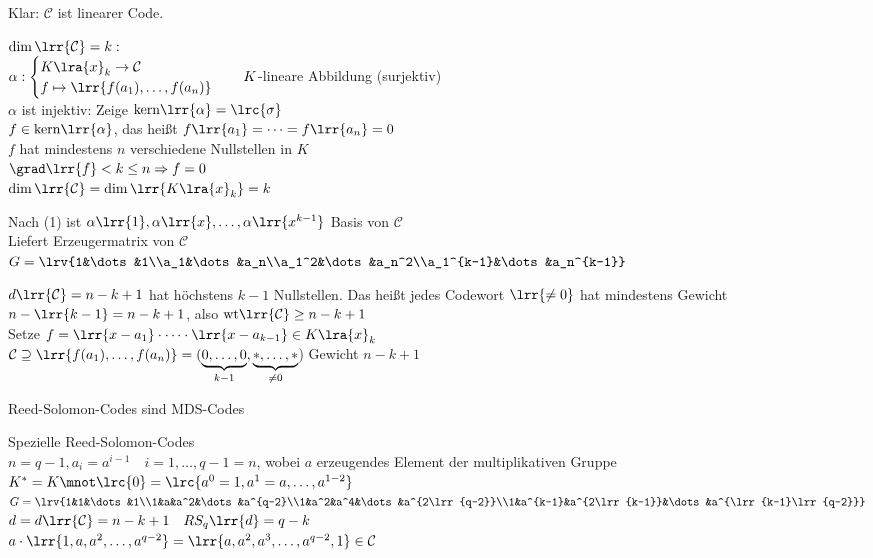 				Klar: $\mathcal{C}$ ist linearer Code.
			
					\item $\dim\lrr{\mathcal{C}}=k:$\\
						$\alpha:\begin{cases}K\lra{x}_k\rightarrow\mathcal{C}\\f\mapsto\lrr{f(a_1),\dots,f(a_n)}\end{cases}\quad K$-lineare Abbildung (surjektiv)\\
						$\alpha$ ist injektiv: Zeige $\mbox{kern}\lrr{\alpha}=\lrc{\sigma}$\\
						$f\in\mbox{kern}\lrr{\alpha}$, das heißt $f\lrr{a_1}=\dots=f\lrr{a_n}=0$\\
						$f$ hat mindestens $n$ verschiedene Nullstellen in $K$\\
						$\grad\lrr{f}<k\leq n\Rightarrow f=0$\\
						$\dim\lrr{\mathcal{C}}=\dim\lrr{K\lra{x}_k}=k$
					\item Nach (1) ist $\alpha\lrr{1},\alpha\lrr{x},\dots,\alpha\lrr{x^{k-1}}$ Basis von $\mathcal{C}$\\
						Liefert Erzeugermatrix von $\mathcal{C}$\\
						$G=\lrv{1&\dots&1\\a_1&\dots&a_n\\a_1^2&\dots&a_n^2\\a_1^{k-1}&\dots&a_n^{k-1}}$
					\item $d\lrr{\mathcal{C}}=n-k+1$ hat höchstens $k-1$ Nullstellen. Das heißt jedes Codewort $\lrr{\neq 0}$ hat mindestens Gewicht $n-\lrr{k-1}=n-k+1$, also $\mbox{wt}\lrr{\mathcal{C}}\geq n-k+1$\\
						Setze $f=\lrr{x-a_1}\cdot\dots\cdot\lrr{x-a_{k-1}}\in K\lra{x}_k$\\
						$\mathcal{C}\supseteq\lrr{f(a_1),\dots,f(a_n)}=(\underbrace{0,\dots,0}_{k-1},\underbrace{*,\dots,*}_{\neq 0}$) Gewicht $n-k+1$
					\item Reed-Solomon-Codes sind MDS-Codes
				\subExEnd
			\item Spezielle Reed-Solomon-Codes\\
				$n=q-1, a_i=a^{i-1}\quad i=1,\dots, q-1=n$, wobei $a$ erzeugendes Element der multiplikativen Gruppe $K^*=K\mnot\lrc{0}=\lrc{a^0=1,a^1=a,\dots,a^{1-2}}$\\
				$G=\lrv{1&1&\dots&1\\1&a&a^2&\dots&a^{q-2}\\1&a^2&a^4&\dots&a^{2\lrr{q-2}}\\1&a^{k-1}&a^{2\lrr{k-1}}&\dots&a^{\lrr{k-1}\lrr{q-2}}}$\\
				$d=d\lrr{\mathcal{C}}=n-k+1\quad RS_q\lrr{d}=q-k$\\
				$a\cdot\lrr{1,a,a^2,\dots, a^{q-2}}=\lrr{a,a^2,a^3,\dots,a^{q-2},1}\in\mathcal{C}$
			
